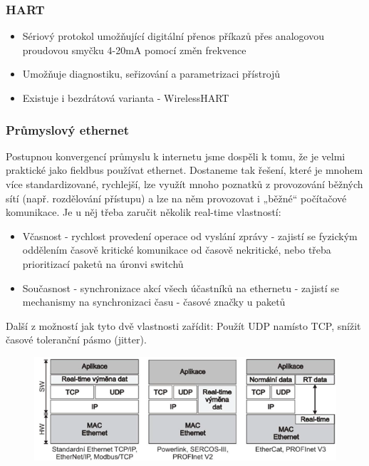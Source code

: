 \subsubsection*{HART}
\begin{itemize}
  \item Sériový protokol umožňující digitální přenos příkazů přes analogovou proudovou smyčku 4-20mA pomocí změn frekvence
  \item Umožňuje diagnostiku, seřizování a parametrizaci přístrojů
  \item Existuje i bezdrátová varianta - WirelessHART
\end{itemize}

\subsubsection*{Průmyslový ethernet}
Postupnou konvergencí průmyslu k internetu jsme dospěli k tomu, že je velmi praktické jako fieldbus používat ethernet. Dostaneme tak řešení, které je mnohem více standardizované, rychlejší, lze využít mnoho poznatků z provozování běžných sítí (např. rozdělování přístupu) a lze na něm provozovat i „běžné“ počítačové komunikace. 
Je u něj třeba zaručit několik real-time vlastností:
\begin{itemize}
  \item Včasnost - rychlost provedení operace od vyslání zprávy - zajistí se fyzickým oddělením časově kritické komunikace od časově nekritické, nebo třeba prioritizací paketů na úronvi switchů
  \item Současnost - synchronizace akcí všech účastníků na ethernetu - zajistí se mechanismy na synchronizaci času - časové značky u paketů
\end{itemize}
Další z možností jak tyto dvě vlastnosti zařídit: Použít UDP namísto TCP, snížit časové toleranční pásmo (jitter).

\begin{figure}[h]
  \begin{center}
    \includegraphics[scale = 1]{img/Picture19.png}
  \end{center}
\end{figure}

